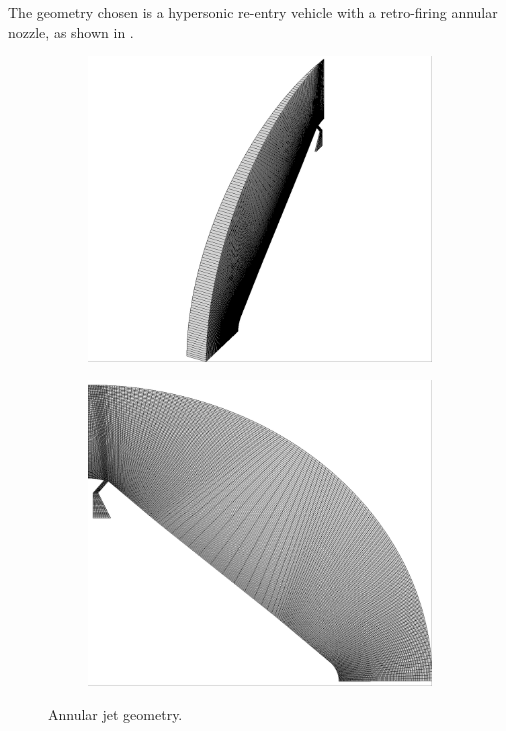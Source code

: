 The geometry chosen is a hypersonic re-entry vehicle with a retro-firing annular
nozzle, as shown in .
\begin{figure}[h]
  \centering
	\begin{subfigure}[b]{0.4\textwidth}
    \centering
    \includegraphics[width=\textwidth]{figures/all_iso.png}
  \end{subfigure}
	\begin{subfigure}[b]{0.4\textwidth}
    \centering
    \includegraphics[width=\textwidth]{figures/all_side.png}
  \end{subfigure}
  \caption{Annular jet geometry.}
  \label{fig:annular-jet-side}
\end{figure}
